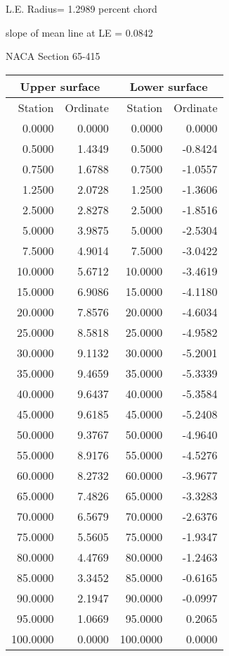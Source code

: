 \documentclass[11pt]{book}
\begin{document}
L.E. Radius=  1.2989 percent chord


 slope of mean line at LE =  0.0842
 \newpage
  \label{s65-415}
 \begin{Large}
 NACA Section 65-415
 \end{Large}
  
 \vspace{8mm}
 \begin{tabular}{|r|r|r|r|} \hline 
 \multicolumn{2}{|c|}{Upper surface} & \multicolumn{2}{|c|}{Lower surface} \\
 \hline
 Station & Ordinate & Station & Ordinate \\
 \hline
0.0000 & 0.0000 & 0.0000 & 0.0000 \\
0.5000 & 1.4349 & 0.5000 & -0.8424 \\
0.7500 & 1.6788 & 0.7500 & -1.0557 \\
1.2500 & 2.0728 & 1.2500 & -1.3606 \\
2.5000 & 2.8278 & 2.5000 & -1.8516 \\
5.0000 & 3.9875 & 5.0000 & -2.5304 \\
7.5000 & 4.9014 & 7.5000 & -3.0422 \\
10.0000 & 5.6712 & 10.0000 & -3.4619 \\
15.0000 & 6.9086 & 15.0000 & -4.1180 \\
20.0000 & 7.8576 & 20.0000 & -4.6034 \\
25.0000 & 8.5818 & 25.0000 & -4.9582 \\
30.0000 & 9.1132 & 30.0000 & -5.2001 \\
35.0000 & 9.4659 & 35.0000 & -5.3339 \\
40.0000 & 9.6437 & 40.0000 & -5.3584 \\
45.0000 & 9.6185 & 45.0000 & -5.2408 \\
50.0000 & 9.3767 & 50.0000 & -4.9640 \\
55.0000 & 8.9176 & 55.0000 & -4.5276 \\
60.0000 & 8.2732 & 60.0000 & -3.9677 \\
65.0000 & 7.4826 & 65.0000 & -3.3283 \\
70.0000 & 6.5679 & 70.0000 & -2.6376 \\
75.0000 & 5.5605 & 75.0000 & -1.9347 \\
80.0000 & 4.4769 & 80.0000 & -1.2463 \\
85.0000 & 3.3452 & 85.0000 & -0.6165 \\
90.0000 & 2.1947 & 90.0000 & -0.0997 \\
95.0000 & 1.0669 & 95.0000 & 0.2065 \\
100.0000 & 0.0000 & 100.0000 & 0.0000 \\
 \hline 
 \end{tabular}
\end{document}

